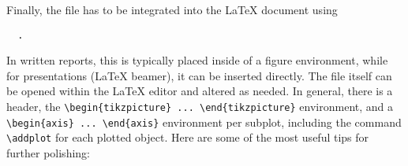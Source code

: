 \documentclass{article}
\begin{document}
Finally, the file has to be integrated into the LaTeX document using
%
\begin{verbatim}
  .
\end{verbatim}
In written reports, this is typically placed inside of a figure environment, while for presentations (LaTeX beamer), it can be inserted directly.
The file itself can be opened within the LaTeX editor and altered as needed.
In general, there is a header, the \verb|\begin{tikzpicture} ... \end{tikzpicture}| environment, and a \verb|\begin{axis} ... \end{axis}| environment per subplot, including the command \verb|\addplot| for each plotted object.
Here are some of the most useful tips for further polishing:
%
\end{document}
